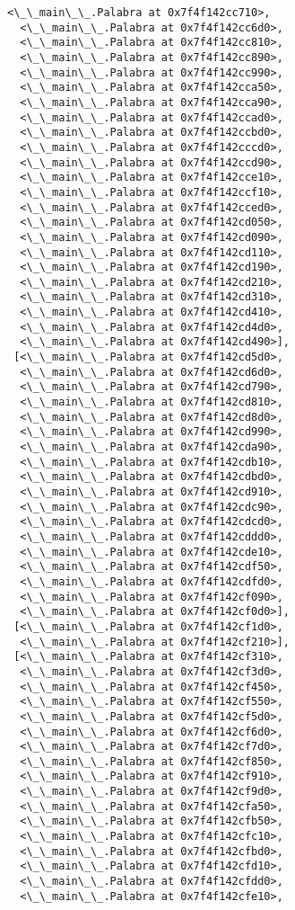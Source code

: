 \documentclass[12pt,a4paper,table]{article}
\begin{document}
\begin{tcolorbox}[breakable, size=fbox, boxrule=.5pt, pad at break*=1mm, opacityfill=0]
\begin{Verbatim}[commandchars=\\\{\}]
  <\_\_main\_\_.Palabra at 0x7f4f142cc710>,
  <\_\_main\_\_.Palabra at 0x7f4f142cc6d0>,
  <\_\_main\_\_.Palabra at 0x7f4f142cc810>,
  <\_\_main\_\_.Palabra at 0x7f4f142cc890>,
  <\_\_main\_\_.Palabra at 0x7f4f142cc990>,
  <\_\_main\_\_.Palabra at 0x7f4f142cca50>,
  <\_\_main\_\_.Palabra at 0x7f4f142cca90>,
  <\_\_main\_\_.Palabra at 0x7f4f142ccad0>,
  <\_\_main\_\_.Palabra at 0x7f4f142ccbd0>,
  <\_\_main\_\_.Palabra at 0x7f4f142cccd0>,
  <\_\_main\_\_.Palabra at 0x7f4f142ccd90>,
  <\_\_main\_\_.Palabra at 0x7f4f142cce10>,
  <\_\_main\_\_.Palabra at 0x7f4f142ccf10>,
  <\_\_main\_\_.Palabra at 0x7f4f142cced0>,
  <\_\_main\_\_.Palabra at 0x7f4f142cd050>,
  <\_\_main\_\_.Palabra at 0x7f4f142cd090>,
  <\_\_main\_\_.Palabra at 0x7f4f142cd110>,
  <\_\_main\_\_.Palabra at 0x7f4f142cd190>,
  <\_\_main\_\_.Palabra at 0x7f4f142cd210>,
  <\_\_main\_\_.Palabra at 0x7f4f142cd310>,
  <\_\_main\_\_.Palabra at 0x7f4f142cd410>,
  <\_\_main\_\_.Palabra at 0x7f4f142cd4d0>,
  <\_\_main\_\_.Palabra at 0x7f4f142cd490>],
 [<\_\_main\_\_.Palabra at 0x7f4f142cd5d0>,
  <\_\_main\_\_.Palabra at 0x7f4f142cd6d0>,
  <\_\_main\_\_.Palabra at 0x7f4f142cd790>,
  <\_\_main\_\_.Palabra at 0x7f4f142cd810>,
  <\_\_main\_\_.Palabra at 0x7f4f142cd8d0>,
  <\_\_main\_\_.Palabra at 0x7f4f142cd990>,
  <\_\_main\_\_.Palabra at 0x7f4f142cda90>,
  <\_\_main\_\_.Palabra at 0x7f4f142cdb10>,
  <\_\_main\_\_.Palabra at 0x7f4f142cdbd0>,
  <\_\_main\_\_.Palabra at 0x7f4f142cd910>,
  <\_\_main\_\_.Palabra at 0x7f4f142cdc90>,
  <\_\_main\_\_.Palabra at 0x7f4f142cdcd0>,
  <\_\_main\_\_.Palabra at 0x7f4f142cddd0>,
  <\_\_main\_\_.Palabra at 0x7f4f142cde10>,
  <\_\_main\_\_.Palabra at 0x7f4f142cdf50>,
  <\_\_main\_\_.Palabra at 0x7f4f142cdfd0>,
  <\_\_main\_\_.Palabra at 0x7f4f142cf090>,
  <\_\_main\_\_.Palabra at 0x7f4f142cf0d0>],
 [<\_\_main\_\_.Palabra at 0x7f4f142cf1d0>,
  <\_\_main\_\_.Palabra at 0x7f4f142cf210>],
 [<\_\_main\_\_.Palabra at 0x7f4f142cf310>,
  <\_\_main\_\_.Palabra at 0x7f4f142cf3d0>,
  <\_\_main\_\_.Palabra at 0x7f4f142cf450>,
  <\_\_main\_\_.Palabra at 0x7f4f142cf550>,
  <\_\_main\_\_.Palabra at 0x7f4f142cf5d0>,
  <\_\_main\_\_.Palabra at 0x7f4f142cf6d0>,
  <\_\_main\_\_.Palabra at 0x7f4f142cf7d0>,
  <\_\_main\_\_.Palabra at 0x7f4f142cf850>,
  <\_\_main\_\_.Palabra at 0x7f4f142cf910>,
  <\_\_main\_\_.Palabra at 0x7f4f142cf9d0>,
  <\_\_main\_\_.Palabra at 0x7f4f142cfa50>,
  <\_\_main\_\_.Palabra at 0x7f4f142cfb50>,
  <\_\_main\_\_.Palabra at 0x7f4f142cfc10>,
  <\_\_main\_\_.Palabra at 0x7f4f142cfbd0>,
  <\_\_main\_\_.Palabra at 0x7f4f142cfd10>,
  <\_\_main\_\_.Palabra at 0x7f4f142cfdd0>,
  <\_\_main\_\_.Palabra at 0x7f4f142cfe10>,

\end{Verbatim}
\end{tcolorbox}
\end{document}
